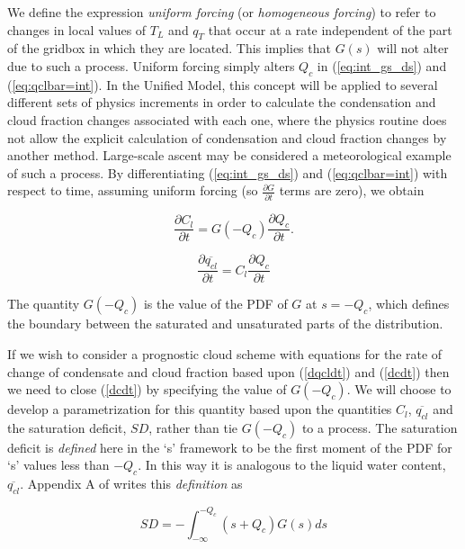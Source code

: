 \documentclass{UMDP_article}
\begin{document}
We define the expression 
\textit{uniform forcing} (or \textit{homogeneous forcing}) to refer to
changes in local values of $T_L$
and $q_T$ that occur at a rate independent of the part of the
gridbox in which they are located. This implies that $G(s)$ will not alter
due to such a process.
Uniform forcing simply alters $Q_c$ in (\ref{eq:int_gs_ds}) and
(\ref{eq:qclbar=int}).
In the Unified Model, this concept will be applied to several different sets of
physics increments in order to calculate the condensation and cloud fraction
changes associated with each one, where the physics routine does not allow
the explicit calculation of condensation and cloud fraction changes by
another method.
Large-scale ascent may be considered a meteorological example of such
a process. By differentiating (\ref{eq:int_gs_ds}) and (\ref{eq:qclbar=int})
with respect to time, assuming uniform forcing
(so ${\frac{\partial G}{\partial t}}$ terms are zero), we obtain

\begin{equation}
{{\frac{\partial C_l}{\partial t}} = G(-Q_c) {\frac{\partial Q_c}
{\partial t} }.}
\label{dcdt}
\end{equation}

\begin{equation}
{\frac{\partial \overline{q_{cl}}}{\partial t}} =
C_l {\frac{\partial Q_c}{\partial t}}
\label{dqcldt}
\end{equation}

The quantity $G(-Q_c)$ is the value of the PDF
of $G$ at $s=-Q_c$, which defines the boundary between
the saturated and unsaturated parts of the distribution. 

If we wish to consider a prognostic cloud scheme with equations for
the rate of change of condensate and cloud fraction based upon (\ref{dqcldt})
and (\ref{dcdt}) then we need to close (\ref{dcdt}) by specifying the 
value of $G(-Q_c)$. We will choose to develop a parametrization for this
quantity based upon the quantities $C_l$, $\overline{q_{cl}}$ and the saturation
deficit, $SD$, rather than tie $G(-Q_c)$ to a process.
The saturation deficit is \textit{defined} here in the `s'
framework to be the first moment of the PDF for `s' values less than $-Q_c$.
In this way it is analogous to the liquid water content, $\overline{q_{cl}}$.
Appendix A of \cite{wg03} writes this \textit{definition} as 

\begin{equation}
{SD = - \int_{-\infty}^{-Q_c} {( s+Q_c ) G(s) ds}}
\label{SD}
\end{equation}
\end{document}
